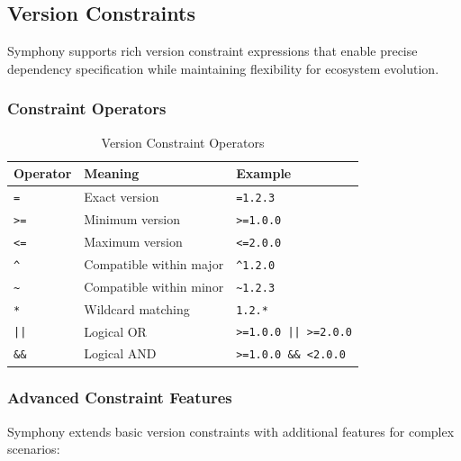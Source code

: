 \subsection{Version Constraints}
\label{subsec:version-constraints}

Symphony supports rich version constraint expressions that enable precise dependency specification while maintaining flexibility for ecosystem evolution.

\subsubsection{Constraint Operators}
\label{subsubsec:constraint-operators}

\begin{table}[h]
\centering
\caption{Version Constraint Operators}
\label{tab:version-constraint-operators}
\begin{tabular}{@{}lll@{}}
\toprule
\textbf{Operator} & \textbf{Meaning} & \textbf{Example} \\
\midrule
\texttt{=} & Exact version & \texttt{=1.2.3} \\
\texttt{>=} & Minimum version & \texttt{>=1.0.0} \\
\texttt{<=} & Maximum version & \texttt{<=2.0.0} \\
\texttt{\textasciicircum} & Compatible within major & \texttt{\textasciicircum 1.2.0} \\
\texttt{\textasciitilde} & Compatible within minor & \texttt{\textasciitilde 1.2.3} \\
\texttt{*} & Wildcard matching & \texttt{1.2.*} \\
\texttt{||} & Logical OR & \texttt{>=1.0.0 || >=2.0.0} \\
\texttt{\&\&} & Logical AND & \texttt{>=1.0.0 \&\& <2.0.0} \\
\bottomrule
\end{tabular}
\end{table}

\subsubsection{Advanced Constraint Features}
\label{subsubsec:advanced-constraint-features}

Symphony extends basic version constraints with additional features for complex scenarios:

